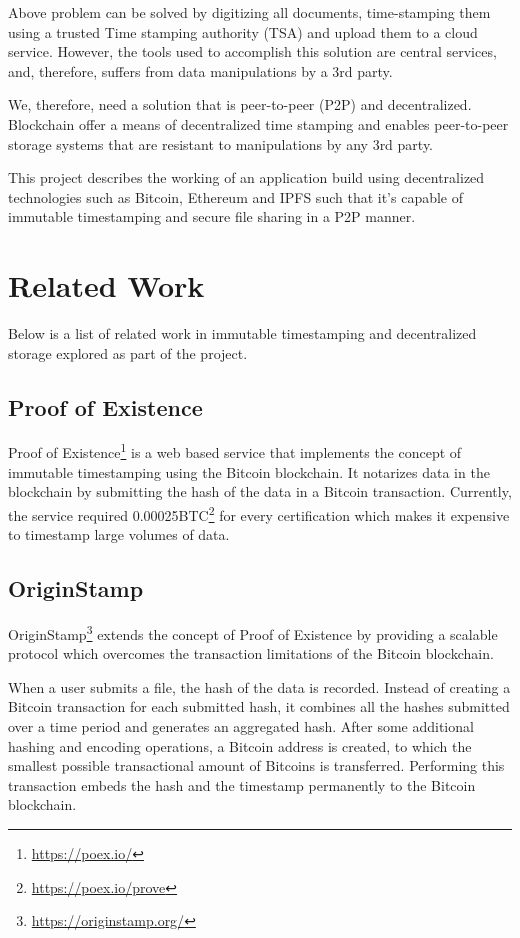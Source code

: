 \documentclass[]{article}
\begin{document}
		Above problem can be solved by digitizing all documents, time-stamping them using a trusted Time stamping authority (TSA) and upload them to a cloud service. However, the tools used to accomplish this solution are central services, and, therefore, suffers from data manipulations by a 3rd party.
		
		We, therefore, need a solution that is peer-to-peer (P2P) and decentralized. Blockchain offer a means of decentralized time stamping and enables peer-to-peer storage systems that are resistant to manipulations by any 3rd party.
		
		This project describes the working of an application build using decentralized technologies such as Bitcoin, Ethereum and IPFS such that it's capable of immutable timestamping and secure file sharing in a P2P manner.
		
	\newpage
	\section{Related Work}
		Below is a list of related work in immutable timestamping and decentralized storage explored as part of the project.
		
		\subsection{Proof of Existence}
			Proof of Existence\footnote{\url{https://poex.io/}} is a web based service that implements the concept of immutable timestamping using the Bitcoin blockchain. It notarizes data in the blockchain by submitting the hash of the data in a Bitcoin transaction. Currently, the service required 0.00025BTC\footnote{\url{https://poex.io/prove}} for every certification which makes it expensive to timestamp large volumes of data.
			
		\subsection{OriginStamp}
			OriginStamp\cite{gipp2015decentralized}\footnote{\url{https://originstamp.org/}} extends the concept of Proof of Existence by providing a scalable protocol which overcomes the transaction limitations of the Bitcoin blockchain.
			
			When a user submits a file, the hash of the data is recorded. Instead of creating a Bitcoin transaction for each submitted hash, it combines all the hashes submitted over a time period and generates an aggregated hash. After some additional hashing and encoding operations, a Bitcoin address is created, to which the smallest possible transactional amount of Bitcoins is transferred. Performing this transaction embeds the hash and the timestamp permanently to the Bitcoin blockchain.
			
\end{document}
